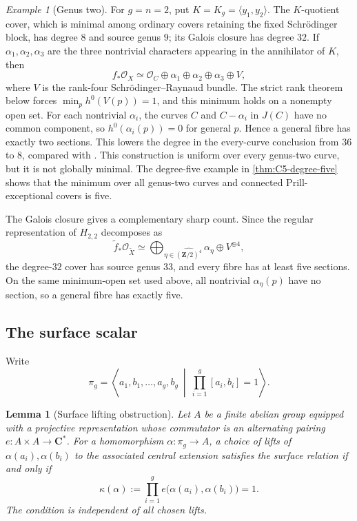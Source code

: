 \documentclass[11pt,reqno]{amsart}
\numberwithin{equation}{section}
\newtheorem{lemma}[lemma]{Lemma}
\theoremstyle{remark}
\newtheorem{example}[example]{Example}
\newcommand{\cO}{\mathcal O}
\newcommand{\bC}{\mathbf C}
\newcommand{\bZ}{\mathbf Z}
\begin{document}
\begin{example}[Genus two]\label{ex:genus-two}
For \(g=n=2\), put
\(K=K_g=\langle y_1,y_2\rangle\).  The \(K\)-quotient cover, which is minimal among ordinary
covers retaining the fixed Schr\"odinger block, has degree \(8\) and
source genus \(9\); its Galois closure has degree \(32\).  If
\(\alpha_1,\alpha_2,\alpha_3\) are the three nontrivial characters
appearing in the annihilator of \(K\), then
\[
 f_*\cO_X\simeq
 \cO_C\oplus\alpha_1\oplus\alpha_2\oplus\alpha_3\oplus V,
\tag{2.18}\label{eq:genus-two-decomposition}
\]
where \(V\) is the rank-four Schr\"odinger--Raynaud bundle.  The strict
rank theorem below forces
\(\min_p h^0(V(p))=1\), and this minimum holds on a nonempty open set.
For each nontrivial \(\alpha_i\), the curves \(C\) and
\(C-\alpha_i\) in \(J(C)\) have no common component, so
\(h^0(\alpha_i(p))=0\) for general \(p\).  Hence a general fibre has
exactly two sections.
This lowers the degree in the every-curve conclusion from \(36\) to
\(8\), compared with \cite{LandesmanLittPrill}.  This construction is
uniform over every genus-two curve, but it is not globally minimal.
The degree-five example in \cref{thm:C5-degree-five} shows that the
minimum over all genus-two curves and connected Prill-exceptional
covers is five.

The Galois closure gives a complementary sharp count.  Since the
regular representation of \(H_{2,2}\) decomposes as
\[
 \widetilde f_*\cO_{\widetilde X}
 \simeq
 \bigoplus_{\eta\in\widehat{(\bZ/2)^4}}\alpha_\eta
 \oplus V^{\oplus4},
\]
the degree-\(32\) cover has source genus \(33\), and every fibre has at least five
sections.  On the same minimum-open set used above, all nontrivial
\(\alpha_\eta(p)\) have no section, so a general fibre has exactly five.
\end{example}


\subsection{The surface scalar}

Write
\[
 \pi_g=\left\langle a_1,b_1,\ldots,a_g,b_g\ \middle|\
 \prod_{i=1}^g[a_i,b_i]=1\right\rangle.
\]

\begin{lemma}[Surface lifting obstruction]\label{lem:surface-lift}
Let \(A\) be a finite abelian group equipped with a projective
representation whose commutator is an alternating pairing
\(e\colon A\times A\to\bC^*\).  For a homomorphism
\(\alpha\colon\pi_g\to A\), a choice of lifts of
\(\alpha(a_i),\alpha(b_i)\) to the associated central extension satisfies
the surface relation if and only if
\[
 \kappa(\alpha):=
 \prod_{i=1}^g e\bigl(\alpha(a_i),\alpha(b_i)\bigr)=1.
\tag{2.19}\label{eq:surface-obstruction}
\]
The condition is independent of all chosen lifts.
\end{lemma}
\end{document}
